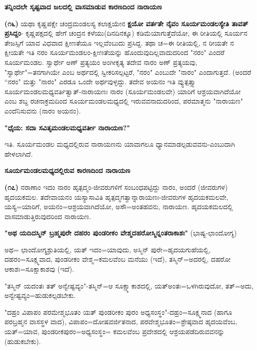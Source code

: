 \begin{center}
\textbf{ತನ್ನಿಂದಲೇ ಸೃಷ್ಟವಾದ ಜಲದಲ್ಲಿ ವಾಸಮಾಡುವ ಕಾರಣದಿಂದ ನಾರಾಯಣ}
\end{center}

\textbf{(೧೬)} ಯಥಾ ಕೃಷ್ಣಪಕ್ಷೇ ಚಂದ್ರಮಂಡಲಸ್ಯ ಕಲಾಕ್ಷಯೇನ \textbf{ಕ್ಷಯೋ ವರ್ತತೇ ನೈವಂ ಸೂರ್ಯಮಂಡಲಸ್ಯೇತಿ ತಾವತ್ ಪ್ರಸಿದ್ದಂ}- ಕೃಷ್ಣಪಕ್ಷದಲ್ಲಿ ಹೇಗೆ ಚಂದ್ರನ ಕಳೆಯು\break (ದಿನದಿನಕ್ಕೂ) ಕಡಿಮೆಯಾಗುತ್ತೆದೆಯೋ, ಈ ರೀತಿಯಲ್ಲಿ ಸೂರ್ಯನ ತೇಜಸ್ಸಿಗೆ ಯಾವ ವಿಧವಾದ ಕ್ಷೀಣತೆಯೂ ಇಲ್ಲವೆಂಬುದು ಪ್ರಸಿದ್ದ. ತಥಾ ಚ=ಈ ರೀತಿಯಲ್ಲಿ, ನ ರೀಯತೇ ನ ಕ್ಷೀಯತೇ ಇತಿ ನರಂ ಸೂರ್ಯಮಂಡಲಂ-ಕ್ಷೀಣತೆಯನ್ನು ಹೊಂದುವುದಿಲ್ಲವಾದುದರಿಂದ "ನರಂ" ಎಂದರೆ ಸೂರ್ಯಮಂಡಲ. ಸ್ವಾರ್ಥೇ ಅಣ್ ಪ್ರತ್ಯಯಂ ಅಂಗೀಕೃತ್ಯ ತದೇವ ನಾರಂ ಅಣ್ ಪ್ರತ್ಯಯವು, "ಸ್ವಾರ್ಥೇ"=ತನಗಾಗಿಯೇ ಎಂಬ ಅರ್ಥದಲ್ಲಿ ಸ್ವೀಕರಿಸಲ್ಪಟ್ಟರೆ, "ನರಂ" ಎಂಬುದೇ "ನಾರಂ" ಎಂದಾಗುತ್ತದೆ. (ಅಂದರೆ “ನರಂ" ಮತ್ತು "ನಾರಂ" ಎರಡೂ ಒಂದೇ ಅರ್ಥವುಳ್ಳದ್ದು. ತದೇವ ಅಯನಂ ಇತಿ ವ್ಯುತ್ಪತ್ತ್ಯಾ ಸೂರ್ಯಮಂಡಲಮಧ್ಯವರ್ತಿತ್ವಾತ್-ನಾರಾಯಣಃ ನಾರಂ (ಸೂರ್ಯಮಂಡಲವೇ) ಯಾರಿಗೆ ಆಶ್ರಯವಾಗಿದೆಯೋ ಎಂಬ ಶಬ್ದ ರಚನಾಕ್ರಮದಿಂದ ಸೂರ್ಯಮಂಡಲಮಧ್ಯದಲ್ಲಿ ಇರುವವನಾದುದರಿಂದ, ಪರಮಾತ್ಮನು "ನಾರಾಯಣ" ಎಂದೆನಿಸುವನು (ನಾರಂ ಅಯನಂ).

\begin{center}
\textbf{"ಧೈಯ: ಸದಾ ಸವಿತೃಮಂಡಲಮಧ್ಯವರ್ತೀ ನಾರಾಯಣ?"}
\end{center}

\noindent
ಇತಿ. ಸೂರ್ಯಮಂಡಲ ಮಧ್ಯದಲ್ಲಿರುವ ನಾರಾಯಣನು ಯಾವಾಗಲೂ ಧ್ಯಾನಮಾಡಲ್ಪಡುವವನು-ಎಂಬುದಾಗಿ ಹೇಳಲಾಗಿದೆ.

\begin{center}
\textbf{ಸೂರ್ಯಮಂಡಲಮಧ್ಯದಲ್ಲಿರುವ ಕಾರಣದಿಂದ ನಾರಾಯಣ}
\end{center}

\textbf{(೧೭)} ನರಾಣಾಂ ಇದಂ ನಾರಂ ಹೃತ್ಪದ್ಮಂ-ಜೀವರುಗಳಿಗೆ ಸಂಬಂಧಪಟ್ಟಿದ್ದು ನಾರಂ, ಅಂದರೆ (ಜೀವರುಗಳ) ಹೃದಯಕಮಲ. ತದೇವಾಯನಂ ಯಸ್ಯಾಸಾವಿತಿ ಹೃತ್ಪದ್ಮಗತ್ವಾನ್ನಾರಾಯಣಃ-ಜೀವರುಗಳ ಹೃದಯಕಮಲವೇ, ಯಸ್ಯ=ಯಾರಿಗೆ, ಅಯನಂ=ಆಶ್ರಯವಾಗಿ\-ದೆಯೋ, ಅಸೌ=ಅಂತಹವನು, ನಾರಾಯಣ. ಹೃದಯಕಮಲದಲ್ಲಿ ವಾಸಮಾಡುತ್ತಿರುವುದರಿಂದ ನಾರಾಯಣ.

\textbf{"ಅಥ ಯದಿದಸ್ಮಿನ್ ಬ್ರಹ್ಮಪುರೇ ದಹರಂ ಪುಂಡರೀಕಂ ವೇಶ್ಮದಹರೋಸ್ಮಿನ್ನಂತರಾಕಾಶಃ"} (ಭಾಷ್ಯ-ಛಾಂದೋಗ್ಯ)

ಅಥ= ಛಾಂದೋಗ್ಯಶ್ರುತಿಯಲ್ಲಿ, ಯತ್ ಇದಂ=ಯಾವುದು, ಅಸ್ಮಿನ್ ಪುರೇ=ಹೃದಯ\-ಗುಹೆಯಲ್ಲಿ, ದಹರಂ=ಸೂಕ್ಷ್ಮವಾದ, ಪುಂಡರೀಕಂ ವೇಶ್ಮ=ಕಮಲವೆಂಬ ಮನೆಯು (ಇದೆ), ತಸ್ಮಿನ್=ಅದರಲ್ಲಿ, ದಹರೋ ಆಕಾಶಃ=ಸೂಕ್ಷಾಕಾಶವು (ಇದೆ).

"ತಸ್ಮಿನ್ ಯದಂತಃ ತತ್ ಅನ್ವೇಷ್ಟವ್ಯಂ"-ತಸ್ಮಿನ್=ಆ ಸೂಕ್ಷ್ಮಾಕಾಶದಲ್ಲಿ, ಯತ್\break ಅಂತಃ=ಒಳಗಿರುವುದೋ, ತತ್=ಅದು, ಅನ್ವೇಷ್ಟವ್ಯಂ=ಹುಡುಕಲ್ಪಡಬೇಕು.

\newpage

"ದಹ್ರಂ ವಿಪಾಪಂ ಪರಮೇಶ್ಮಭೂತಂ ಯತ್ ಪುಂಡರೀಕಂ ಪುರಂ ಅಧ್ಯಸಂಸ್ಥಂ"-ದಹ್ರಂ=\-ಸೂಕ್ಷ್ಮನಾದ (ಹಾಗೂ ಪರಬ್ರಹ್ಮನ ವಾಸಸ್ಥಳ ವಾದ), ವಿಪಾಪಂ=ದೋಷವರ್ಜಿತನಾದ, ಪರವೇಶ್ಮಭೂತಂ=ಶ್ರೇಷ್ಠವಾದ ಹೃದಯವೆಂಬ, ಯತ್=ಯಾವ, ಪುಂಡರೀಕಪುರಂ=ಅಧ್ಯಸಂಸ್ಥಂ\-= ಕಮಲವೆಂಬ ಪ್ರದೇಶದಲ್ಲಿ ಆಶ್ರಯಪಡೆದಿರುವವನನ್ನು (ಹುಡುಕಬೇಕು).

